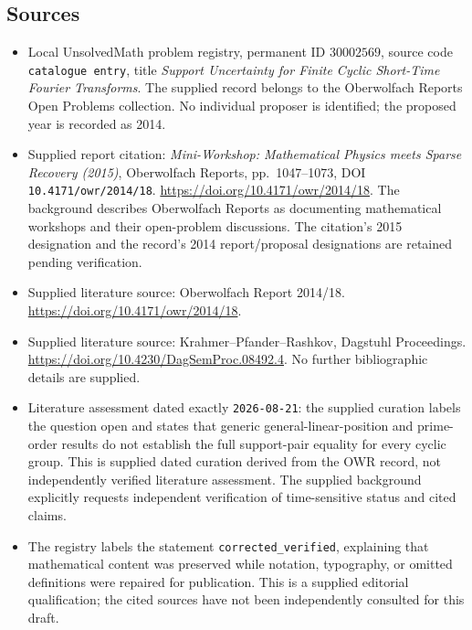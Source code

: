 \documentclass[11pt]{article}
\begin{document}
\subsection{Sources}
\begin{itemize}
\item Local UnsolvedMath problem registry, permanent ID \(30002569\), source code \texttt{catalogue entry}, title \emph{Support Uncertainty for Finite Cyclic Short-Time Fourier Transforms}. The supplied record belongs to the Oberwolfach Reports Open Problems collection. No individual proposer is identified; the proposed year is recorded as 2014.
\item Supplied report citation: \emph{Mini-Workshop: Mathematical Physics meets Sparse Recovery (2015)}, Oberwolfach Reports, pp.\ 1047--1073, DOI \texttt{10.4171/owr/2014/18}. \url{https://doi.org/10.4171/owr/2014/18}. The background describes Oberwolfach Reports as documenting mathematical workshops and their open-problem discussions. The citation's 2015 designation and the record's 2014 report/proposal designations are retained pending verification.
\item Supplied literature source: Oberwolfach Report 2014/18. \url{https://doi.org/10.4171/owr/2014/18}.
\item Supplied literature source: Krahmer--Pfander--Rashkov, Dagstuhl Proceedings. \url{https://doi.org/10.4230/DagSemProc.08492.4}. No further bibliographic details are supplied.
\item Literature assessment dated exactly \texttt{2026-08-21}: the supplied curation labels the question open and states that generic general-linear-position and prime-order results do not establish the full support-pair equality for every cyclic group. This is supplied dated curation derived from the OWR record, not independently verified literature assessment. The supplied background explicitly requests independent verification of time-sensitive status and cited claims.
\item The registry labels the statement \texttt{corrected\_verified}, explaining that mathematical content was preserved while notation, typography, or omitted definitions were repaired for publication. This is a supplied editorial qualification; the cited sources have not been independently consulted for this draft.
\end{itemize}
\end{document}

